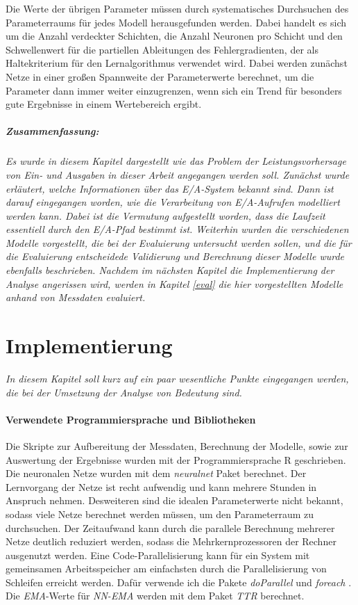 \documentclass[
	12pt,
	a4paper,
	BCOR10mm,
	DIV14,
	listof=totoc,
	bibliography=totoc,
	headsepline
]{scrreprt}
\begin{document}
Die Werte der übrigen Parameter müssen durch systematisches Durchsuchen des Parameterraums für jedes Modell herausgefunden werden. Dabei handelt es sich um die Anzahl verdeckter Schichten, die Anzahl Neuronen pro Schicht und den Schwellenwert für die partiellen Ableitungen des Fehlergradienten, der als Haltekriterium für den Lernalgorithmus verwendet wird.
Dabei werden zunächst Netze in einer großen Spannweite der Parameterwerte berechnet, um die Parameter dann immer weiter einzugrenzen, wenn sich ein Trend für besonders gute Ergebnisse in einem Wertebereich ergibt.

\paragraph{Zusammenfassung:}
\textit{
Es wurde in diesem Kapitel dargestellt wie das Problem der Leistungsvorhersage von Ein- und Ausgaben in dieser Arbeit angegangen werden soll.
Zunächst wurde erläutert, welche Informationen über das E/A-System bekannt sind. Dann ist darauf eingegangen worden, wie die Verarbeitung von E/A-Aufrufen modelliert werden kann. Dabei ist die Vermutung aufgestellt worden, dass die Laufzeit essentiell durch den E/A-Pfad bestimmt ist. 
Weiterhin wurden die verschiedenen Modelle vorgestellt, die bei der Evaluierung untersucht werden sollen, und die für die Evaluierung entscheidede Validierung und Berechnung dieser Modelle wurde ebenfalls beschrieben.
Nachdem im nächsten Kapitel die Implementierung der Analyse angerissen wird, werden in Kapitel \ref{eval} die hier vorgestellten Modelle anhand von Messdaten evaluiert.
}


\chapter{Implementierung}
\textit{%
In diesem Kapitel soll kurz auf ein paar wesentliche Punkte eingegangen werden, die bei der Umsetzung der Analyse von Bedeutung sind.
}
\bigskip

\subsubsection{Verwendete Programmiersprache und Bibliotheken}
Die Skripte zur Aufbereitung der Messdaten, Berechnung der Modelle, sowie zur Auswertung der Ergebnisse wurden mit der Programmiersprache R geschrieben.
Die neuronalen Netze wurden mit dem \textit{neuralnet} Paket \cite{gunther2010neuralnet} berechnet. Der Lernvorgang der Netze ist recht aufwendig und kann mehrere Stunden in Anspruch nehmen.
Desweiteren sind die idealen Parameterwerte nicht bekannt, sodass viele Netze berechnet werden müssen, um den Parameterraum zu durchsuchen.
Der Zeitaufwand kann durch die parallele Berechnung mehrerer Netze deutlich reduziert werden, sodass die Mehrkernprozessoren der Rechner ausgenutzt werden.
Eine Code-Parallelisierung kann für ein System mit gemeinsamen Arbeitsspeicher am einfachsten durch die Parallelisierung von Schleifen erreicht werden. Dafür verwende ich die Pakete \textit{doParallel} und \textit{foreach} \cite{weston2014getting}.
Die \textit{EMA}-Werte für \textit{NN-EMA} werden mit dem Paket \textit{TTR} berechnet.
\end{document}

